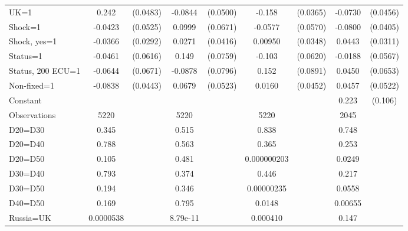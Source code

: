 \begin{tabular}{l|cccccc|cc}
UK=1            &    0.242\sym{***}& (0.0483)&  -0.0844\sym{*}  & (0.0500)&   -0.158\sym{***}& (0.0365)&  -0.0730         & (0.0456)\\
Shock=1         &  -0.0423         & (0.0525)&   0.0999         & (0.0671)&  -0.0577         & (0.0570)&  -0.0800\sym{**} & (0.0405)\\
Shock, yes=1    &  -0.0366         & (0.0292)&   0.0271         & (0.0416)&  0.00950         & (0.0348)&   0.0443         & (0.0311)\\
Status=1        &  -0.0461         & (0.0616)&    0.149\sym{**} & (0.0759)&   -0.103\sym{*}  & (0.0620)&  -0.0188         & (0.0567)\\
Status, 200 ECU=1&  -0.0644         & (0.0671)&  -0.0878         & (0.0796)&    0.152\sym{*}  & (0.0891)&   0.0450         & (0.0653)\\
Non-fixed=1     &  -0.0838\sym{*}  & (0.0443)&   0.0679         & (0.0523)&   0.0160         & (0.0452)&   0.0457         & (0.0522)\\
Constant        &                  &         &                  &         &                  &         &    0.223\sym{**} &  (0.106)\\
\hline
Observations    &     5220         &         &     5220         &         &     5220         &         &     2045         &         \\
D20=D30         &    0.345         &         &    0.515         &         &    0.838         &         &    0.748         &         \\
D20=D40         &    0.788         &         &    0.563         &         &    0.365         &         &    0.253         &         \\
D20=D50         &    0.105         &         &    0.481         &         &0.000000203         &         &   0.0249         &         \\
D30=D40         &    0.793         &         &    0.374         &         &    0.446         &         &    0.217         &         \\
D30=D50         &    0.194         &         &    0.346         &         &0.00000235         &         &   0.0558         &         \\
D40=D50         &    0.169         &         &    0.795         &         &   0.0148         &         &  0.00655         &         \\
Russia=UK       &0.0000538         &         & 8.79e-11         &         & 0.000410         &         &    0.147         &         \\

\end{tabular}
